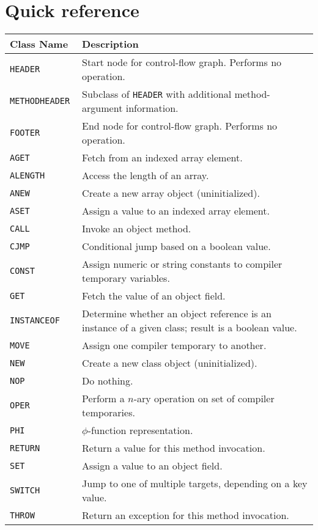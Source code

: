 \documentclass[11pt,notitlepage,twocolumn,twoside]{article}
\newcommand{\phifunction}{$\phi$-function}
\begin{document}
\onecolumn\appendix\section{Quick reference}
\label{sec:quads}
\begin{tabular}{p{1.25in}p{4.5in}} 
\small\bf Class Name & \small\bf Description \\ \hline
\tt HEADER & Start node for control-flow graph.  Performs no operation.\\
\tt METHODHEADER & Subclass of \texttt{HEADER} with additional 
                   method-argument information.\\
\tt FOOTER & End node for control-flow graph.  Performs no operation.\\ \hline
\tt AGET & Fetch from an indexed array element.\\
\tt ALENGTH & Access the length of an array. \\
\tt ANEW & Create a new array object (uninitialized). \\
\tt ASET & Assign a value to an indexed array element. \\
\tt CALL & Invoke an object method. \\
\tt CJMP & Conditional jump based on a boolean value. \\
\tt CONST & Assign numeric or string constants to 
            compiler temporary variables. \\
\tt GET & Fetch the value of an object field. \\
\tt INSTANCEOF & Determine whether an object reference is an instance of a
                 given class; result is a boolean value. \\
\tt MOVE & Assign one compiler temporary to another. \\
\tt NEW  & Create a new class object (uninitialized). \\
\tt NOP  & Do nothing. \\
\tt OPER & Perform a $n$-ary operation on set of compiler temporaries.\\
\tt PHI  & \phifunction{} representation.\\
\tt RETURN & Return a value for this method invocation.\\
\tt SET  & Assign a value to an object field. \\
\tt SWITCH & Jump to one of multiple targets, depending on a key value. \\
\tt THROW & Return an exception for this method invocation. \\
\hline
\end{tabular}
\end{document}
